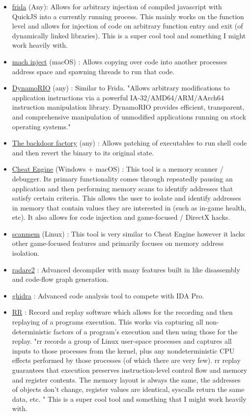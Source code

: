 \begin{itemize}
\item \href{https://frida.re/docs/home/}{frida} (Any): Allows for arbitrary injection of compiled javascript with QuickJS into a currently running process. This mainly works on the function level and allows for injection of code on arbitrary function entry and exit (of dynamically linked libraries). This is a super cool tool and something I might work heavily with. 
\item \href{https://github.com/rentzsch/mach_inject}{mach inject} (macOS) : Allows copying over code into another processes address space and spawning threads to run that code.
\item \href{https://dynamorio.org/page_home.html}{DynamoRIO} (any) : Similar to Frida. "Allows arbitrary modifications to application instructions via a powerful IA-32/AMD64/ARM/AArch64 instruction manipulation library. DynamoRIO provides efficient, transparent, and comprehensive manipulation of unmodified applications running on stock operating systems." 
\item \href{https://github.com/secretsquirrel/the-backdoor-factory}{The backdoor factory} (any) : Allows patching of executables to run shell code and then revert the binary to its original state. 
    \item \href{https://en.wikipedia.org/wiki/Cheat_Engine}{Cheat Engine} (Windows + macOS) : This tool is a memory scanner / debugger. Its primary functionality comes through repeatedly pausing an application and then performing memory scans to identify addresses that satisfy certain criteria. This allows the user to isolate and identify addresses in memory that contain values they are interested in (such as in-game health, etc). It also allows for code injection and game-focused / DirectX hacks. 
\item \href{https://github.com/scanmem/scanmem}{scanmem} (Linux) : This tool is very similar to Cheat Engine however it lacks other game-focused features and primarily focuses on memory address isolation. 
\item \href{https://rada.re/n/radare2.html}{radare2} : Advanced decompiler with many features built in like disassembly and code-flow graph generation. 
\item \href{https://ghidra-sre.org/}{ghidra} : Advanced code analysis tool to compete with IDA Pro. 
\item \href{https://rr-project.org/}{RR} : Record and replay software which allows for the recording and then replaying of a programs execution. This works via capturing all non-deterministic factors of a program's execution and then using those for the replay. "rr records a group of Linux user-space processes and captures all inputs to those processes from the kernel, plus any nondeterministic CPU effects performed by those processes (of which there are very few). rr replay guarantees that execution preserves instruction-level control flow and memory and register contents. The memory layout is always the same, the addresses of objects don't change, register values are identical, syscalls return the same data, etc. " This is a super cool tool and something that I might work heavily with.  


\end{itemize}

